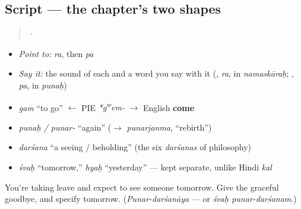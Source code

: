 \subsection*{Script — the chapter's two shapes}
\begin{quote}
 · 
\end{quote}

\begin{itemize}
\raggedright
  \item \emph{Point to:} \emph{ra}, then \emph{pa}
  \item \emph{Say it:} the sound of each and a word you say with it (\textbf{}, \emph{ra}, in \emph{namaskāraḥ}; \textbf{}, \emph{pa}, in \emph{punaḥ})
\end{itemize}

\begin{grammarlens}[title={What you've built: the roots you now carry}]
\begin{itemize}
\raggedright
  \item \emph{gam} \textquotedblleft{}to go\textquotedblright{} $\leftarrow$ PIE \emph{*g\textsuperscript{w}em-} $\to$ English \textbf{come}
  \item \emph{punaḥ / punar-} \textquotedblleft{}again\textquotedblright{} ($\to$ \emph{punarjanma}, \textquotedblleft{}rebirth\textquotedblright{})
  \item \emph{darśana} \textquotedblleft{}a seeing / beholding\textquotedblright{} (the six \emph{darśanas} of philosophy)
  \item \emph{śvaḥ} \textquotedblleft{}tomorrow,\textquotedblright{} \emph{hyaḥ} \textquotedblleft{}yesterday\textquotedblright{} — kept separate, unlike Hindi \emph{kal}
\end{itemize}
\end{grammarlens}

\begin{tcolorbox}[breakable,colback=teal!4,colframe=teal!35!black,title={Before you move on}]
You're taking leave and expect to see someone tomorrow. Give the graceful goodbye, and specify tomorrow. (\emph{Punar-darśanāya} — or \emph{śvaḥ punar-darśanam}.)
\end{tcolorbox}
